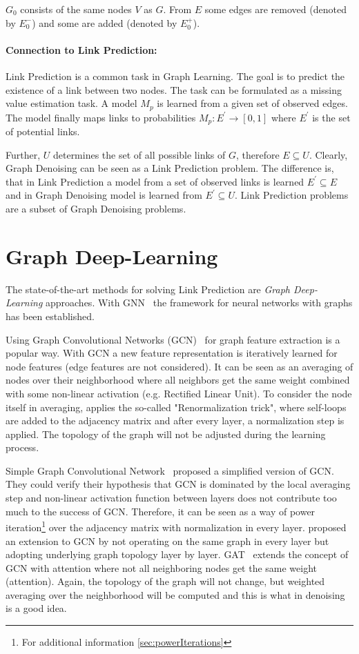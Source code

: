 $G_0$ consists of the same nodes $V$ as $G$. 
From $E$ some edges are removed (denoted by $E^{-}_0$) and some are added
(denoted by $E^{+}_0$).

\paragraph{Connection to Link Prediction:}
Link Prediction is a common task in Graph Learning. 
The goal is to predict the existence of a link between two nodes.
The task can be formulated as a missing value estimation task. A model $M_p$ is learned
from a given set of observed edges. The model finally maps links to probabilities
$M_p : E^{\prime} \rightarrow [0,1]$ where $E^{\prime}$ is the set of potential links.

Further, $U$ determines the set of all possible links of $G$, therefore $E \subseteq U$.
Clearly, Graph Denoising can be seen as a Link Prediction problem.
The difference is, that in Link Prediction a model from a set of observed links is learned
$E^{\prime} \subseteq E$ and in Graph Denoising model is learned from 
$E^{\prime} \subseteq U$.
Link Prediction problems are a subset of Graph Denoising problems.

\section{Graph Deep-Learning}
\label{sec:graph_depp_learning}
The state-of-the-art methods for solving Link Prediction are \textit{Graph Deep-Learning} approaches.
With GNN~\cite{GNN} the framework for neural networks with graphs has been established. 

Using Graph Convolutional Networks (GCN)~\cite{GCN} for graph feature extraction is a popular way. 
With GCN a new feature representation is iteratively learned for node features (edge features are not considered).
It can be seen as an averaging of nodes over their neighborhood where all neighbors get the same weight combined with some non-linear activation (e.g. Rectified Linear Unit). 
To consider the node itself in averaging, \citet{GCN} applies the so-called "Renormalization trick", where self-loops are added to the 
adjacency matrix and after every layer, a normalization step is applied. 
The topology of the graph will not be adjusted during the learning process.

Simple Graph Convolutional Network~\cite{simpleGCN} proposed a simplified version of GCN.
They could verify their hypothesis that GCN is dominated by the local averaging step and non-linear 
activation function between layers does not contribute too much to the success of GCN. 
Therefore, it can be seen as a way of power iteration\footnote{For additional information \ref{sec:powerIterations}}
over the adjacency matrix with normalization in every layer.
\citet{dynamicGCN} proposed an extension to GCN by not operating on the same graph in every layer but adopting
underlying graph topology layer by layer.
GAT~\cite{GAT} extends the concept of GCN with attention where not all neighboring nodes get the same weight (attention).
Again, the topology of the graph will not change, but weighted averaging over the neighborhood 
will be computed and this is what in denoising is a good idea.
